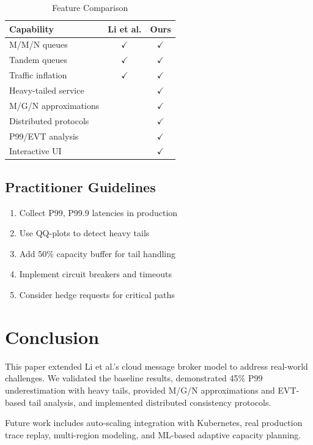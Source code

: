 \documentclass[conference,twocolumn]{IEEEtran}
\begin{document}
\begin{table}[h]
\centering
\caption{Feature Comparison}
\begin{tabular}{lcc}
\toprule
\textbf{Capability} & \textbf{Li et al.} & \textbf{Ours} \\
\midrule
M/M/N queues & $\checkmark$ & $\checkmark$ \\
Tandem queues & $\checkmark$ & $\checkmark$ \\
Traffic inflation & $\checkmark$ & $\checkmark$ \\
Heavy-tailed service & & $\checkmark$ \\
M/G/N approximations & & $\checkmark$ \\
Distributed protocols & & $\checkmark$ \\
P99/EVT analysis & & $\checkmark$ \\
Interactive UI & & $\checkmark$ \\
\bottomrule
\end{tabular}
\label{tab:comparison}
\end{table}

\subsection{Practitioner Guidelines}

\begin{enumerate}[leftmargin=*]
    \item Collect P99, P99.9 latencies in production
    \item Use QQ-plots to detect heavy tails
    \item Add 50\% capacity buffer for tail handling
    \item Implement circuit breakers and timeouts
    \item Consider hedge requests for critical paths
\end{enumerate}

\section{Conclusion}

This paper extended Li et al.'s cloud message broker model to address real-world challenges. We validated the baseline results, demonstrated 45\% P99 underestimation with heavy tails, provided M/G/N approximations and EVT-based tail analysis, and implemented distributed consistency protocols.

Future work includes auto-scaling integration with Kubernetes, real production trace replay, multi-region modeling, and ML-based adaptive capacity planning.
\end{document}
